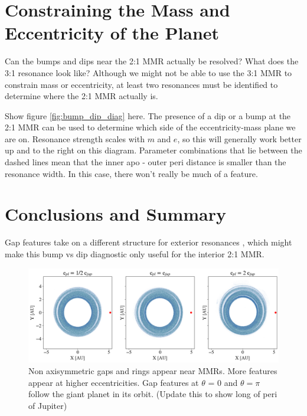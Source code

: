 \documentclass[onecolumn]{aastex63}
\begin{document}
\section{Constraining the Mass and Eccentricity of the Planet}

Can the bumps and dips near the 2:1 MMR actually be resolved? What does the 3:1 resonance look like? Although we might not be able to use the 3:1 MMR to constrain mass or eccentricity, at least two resonances must be identified to determine where the 2:1 MMR actually is.

Show figure \ref{fig:bump_dip_diag} here. The presence of a dip or a bump at the 2:1 MMR can be used to determine which side of the eccentricity-mass plane we are on. Resonance strength scales with $m$ and $e$, so this will generally work better up and to the right on this diagram. Parameter combinations that lie between the dashed lines mean that the inner apo - outer peri distance is smaller than the resonance width. In this case, there won't really be much of a feature.

\section{Conclusions and Summary}

Gap features take on a different structure for exterior resonances \citet{2016ApJ...818..159T}, which might make this bump vs dip diagnostic only useful for the interior 2:1 MMR.

\begin{figure}
\begin{center}
    \includegraphics[width=\textwidth]{figures/xy.png}
    \caption{Non axisymmetric gaps and rings appear near MMRs. More features appear at higher eccentricities. Gap features
    at $\theta$ = 0 and $\theta = \pi$ follow the giant planet in its orbit. (Update this to show long of peri of Jupiter)\label{fig:xy}}
\end{center}
\end{figure}
\end{document}

